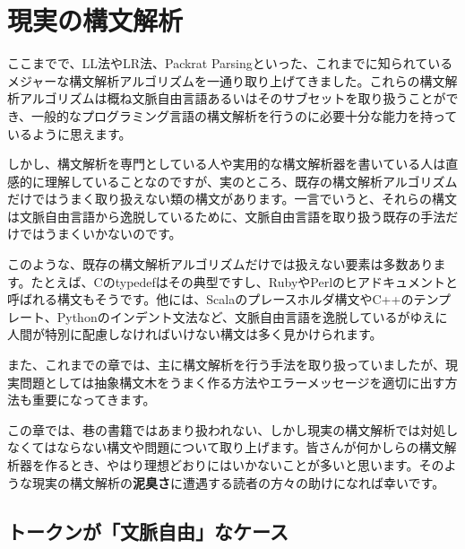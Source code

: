 \hypertarget{chapter7-ux73feux5b9fux306eux69cbux6587ux89e3ux6790}{%
\chapter{現実の構文解析}\label{chapter7-ux73feux5b9fux306eux69cbux6587ux89e3ux6790}}

ここまでで、LL法やLR法、Packrat
Parsingといった、これまでに知られているメジャーな構文解析アルゴリズムを一通り取り上げてきました。これらの構文解析アルゴリズムは概ね文脈自由言語あるいはそのサブセットを取り扱うことができ、一般的なプログラミング言語の構文解析を行うのに必要十分な能力を持っているように思えます。

しかし、構文解析を専門としている人や実用的な構文解析器を書いている人は直感的に理解していることなのですが、実のところ、既存の構文解析アルゴリズムだけではうまく取り扱えない類の構文があります。一言でいうと、それらの構文は文脈自由言語から逸脱しているために、文脈自由言語を取り扱う既存の手法だけではうまくいかないのです。

このような、既存の構文解析アルゴリズムだけでは扱えない要素は多数あります。たとえば、Cのtypedefはその典型ですし、RubyやPerlのヒアドキュメントと呼ばれる構文もそうです。他には、Scalaのプレースホルダ構文やC++のテンプレート、Pythonのインデント文法など、文脈自由言語を逸脱しているがゆえに人間が特別に配慮しなければいけない構文は多く見かけられます。

また、これまでの章では、主に構文解析を行う手法を取り扱っていましたが、現実問題としては抽象構文木をうまく作る方法やエラーメッセージを適切に出す方法も重要になってきます。

この章では、巷の書籍ではあまり扱われない、しかし現実の構文解析では対処しなくてはならない構文や問題について取り上げます。皆さんが何かしらの構文解析器を作るとき、やはり理想どおりにはいかないことが多いと思います。そのような現実の構文解析の\textbf{泥臭さ}に遭遇する読者の方々の助けになれば幸いです。

\hypertarget{chapter7-ux30c8ux30fcux30afux30f3ux304cux6587ux8108ux81eaux7531ux306aux30b1ux30fcux30b9}{%
\section{トークンが「文脈自由」なケース}\label{chapter7-ux30c8ux30fcux30afux30f3ux304cux6587ux8108ux81eaux7531ux306aux30b1ux30fcux30b9}}

